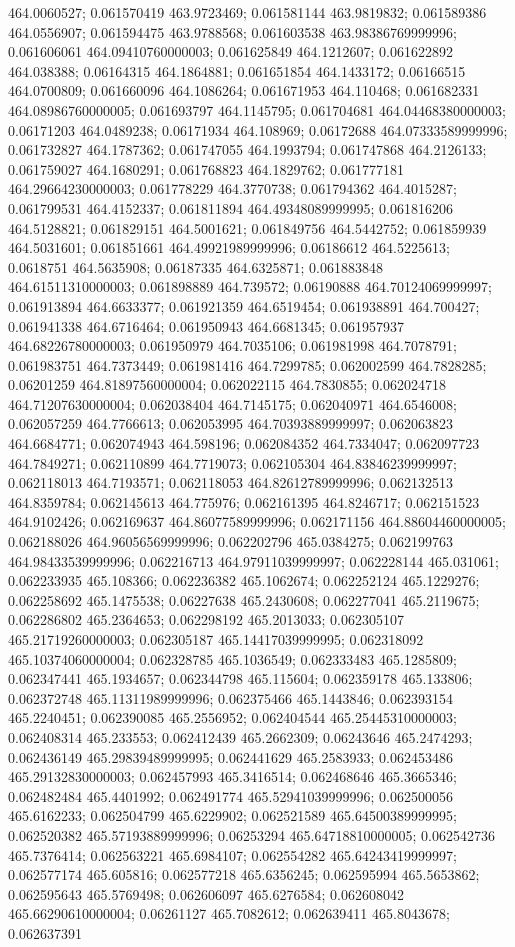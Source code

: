 464.0060527; 0.061570419 463.9723469; 0.061581144 463.9819832; 0.061589386 464.0556907; 0.061594475 463.9788568; 0.061603538 463.98386769999996; 0.061606061 464.09410760000003; 0.061625849 464.1212607; 0.061622892 464.038388; 0.06164315 464.1864881; 0.061651854 464.1433172; 0.06166515 464.0700809; 0.061660096 464.1086264; 0.061671953 464.110468; 0.061682331 464.08986760000005; 0.061693797 464.1145795; 0.061704681 464.04468380000003; 0.06171203 464.0489238; 0.06171934 464.108969; 0.06172688 464.07333589999996; 0.061732827 464.1787362; 0.061747055 464.1993794; 0.061747868 464.2126133; 0.061759027 464.1680291; 0.061768823 464.1829762; 0.061777181 464.29664230000003; 0.061778229 464.3770738; 0.061794362 464.4015287; 0.061799531 464.4152337; 0.061811894 464.49348089999995; 0.061816206 464.5128821; 0.061829151 464.5001621; 0.061849756 464.5442752; 0.061859939 464.5031601; 0.061851661 464.49921989999996; 0.06186612 464.5225613; 0.0618751 464.5635908; 0.06187335 464.6325871; 0.061883848 464.61511310000003; 0.061898889 464.739572; 0.06190888 464.70124069999997; 0.061913894 464.6633377; 0.061921359 464.6519454; 0.061938891 464.700427; 0.061941338 464.6716464; 0.061950943 464.6681345; 0.061957937 464.68226780000003; 0.061950979 464.7035106; 0.061981998 464.7078791; 0.061983751 464.7373449; 0.061981416 464.7299785; 0.062002599 464.7828285; 0.06201259 464.81897560000004; 0.062022115 464.7830855; 0.062024718 464.71207630000004; 0.062038404 464.7145175; 0.062040971 464.6546008; 0.062057259 464.7766613; 0.062053995 464.70393889999997; 0.062063823 464.6684771; 0.062074943 464.598196; 0.062084352 464.7334047; 0.062097723 464.7849271; 0.062110899 464.7719073; 0.062105304 464.83846239999997; 0.062118013 464.7193571; 0.062118053 464.82612789999996; 0.062132513 464.8359784; 0.062145613 464.775976; 0.062161395 464.8246717; 0.062151523 464.9102426; 0.062169637 464.86077589999996; 0.062171156 464.88604460000005; 0.062188026 464.96056569999996; 0.062202796 465.0384275; 0.062199763 464.98433539999996; 0.062216713 464.97911039999997; 0.062228144 465.031061; 0.062233935 465.108366; 0.062236382 465.1062674; 0.062252124 465.1229276; 0.062258692 465.1475538; 0.06227638 465.2430608; 0.062277041 465.2119675; 0.062286802 465.2364653; 0.062298192 465.2013033; 0.062305107 465.21719260000003; 0.062305187 465.14417039999995; 0.062318092 465.10374060000004; 0.062328785 465.1036549; 0.062333483 465.1285809; 0.062347441 465.1934657; 0.062344798 465.115604; 0.062359178 465.133806; 0.062372748 465.11311989999996; 0.062375466 465.1443846; 0.062393154 465.2240451; 0.062390085 465.2556952; 0.062404544 465.25445310000003; 0.062408314 465.233553; 0.062412439 465.2662309; 0.06243646 465.2474293; 0.062436149 465.29839489999995; 0.062441629 465.2583933; 0.062453486 465.29132830000003; 0.062457993 465.3416514; 0.062468646 465.3665346; 0.062482484 465.4401992; 0.062491774 465.52941039999996; 0.062500056 465.6162233; 0.062504799 465.6229902; 0.062521589 465.64500389999995; 0.062520382 465.57193889999996; 0.06253294 465.64718810000005; 0.062542736 465.7376414; 0.062563221 465.6984107; 0.062554282 465.64243419999997; 0.062577174 465.605816; 0.062577218 465.6356245; 0.062595994 465.5653862; 0.062595643 465.5769498; 0.062606097 465.6276584; 0.062608042 465.66290610000004; 0.06261127 465.7082612; 0.062639411 465.8043678; 0.062637391 